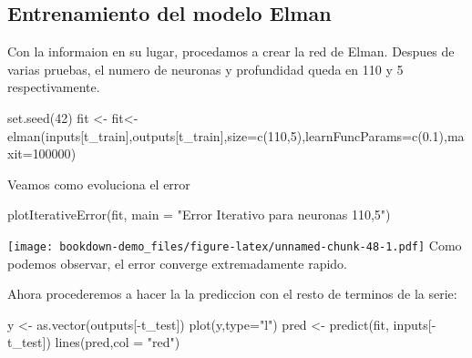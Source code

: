 \documentclass[
]{book}
\newenvironment{Shaded}{\begin{snugshade}}{\end{snugshade}}
\newcommand{\AttributeTok}[1]{\textcolor[rgb]{0.77,0.63,0.00}{#1}}
\newcommand{\DecValTok}[1]{\textcolor[rgb]{0.00,0.00,0.81}{#1}}
\newcommand{\FloatTok}[1]{\textcolor[rgb]{0.00,0.00,0.81}{#1}}
\newcommand{\FunctionTok}[1]{\textcolor[rgb]{0.00,0.00,0.00}{#1}}
\newcommand{\NormalTok}[1]{#1}
\newcommand{\OtherTok}[1]{\textcolor[rgb]{0.56,0.35,0.01}{#1}}
\newcommand{\SpecialCharTok}[1]{\textcolor[rgb]{0.00,0.00,0.00}{#1}}
\newcommand{\StringTok}[1]{\textcolor[rgb]{0.31,0.60,0.02}{#1}}
\begin{document}
\hypertarget{entrenamiento-del-modelo-elman}{%
\subsection{Entrenamiento del modelo Elman}\label{entrenamiento-del-modelo-elman}}

Con la informaion en su lugar, procedamos a crear la red de Elman. Despues de varias pruebas, el numero de neuronas y profundidad queda en 110 y 5 respectivamente.

\begin{Shaded}
\begin{Highlighting}[]
\FunctionTok{set.seed}\NormalTok{(}\DecValTok{42}\NormalTok{)}
\NormalTok{fit }\OtherTok{\textless{}{-}}\NormalTok{ fit}\OtherTok{\textless{}{-}}\FunctionTok{elman}\NormalTok{(inputs[t\_train],outputs[t\_train],}\AttributeTok{size=}\FunctionTok{c}\NormalTok{(}\DecValTok{110}\NormalTok{,}\DecValTok{5}\NormalTok{),}\AttributeTok{learnFuncParams=}\FunctionTok{c}\NormalTok{(}\FloatTok{0.1}\NormalTok{),}\AttributeTok{maxit=}\DecValTok{100000}\NormalTok{)}
\end{Highlighting}
\end{Shaded}

Veamos como evoluciona el error

\begin{Shaded}
\begin{Highlighting}[]
\FunctionTok{plotIterativeError}\NormalTok{(fit, }\AttributeTok{main =} \StringTok{"Error Iterativo para neuronas 110,5"}\NormalTok{)}
\end{Highlighting}
\end{Shaded}

\texttt{[image: bookdown-demo\_files/figure-latex/unnamed-chunk-48-1.pdf]}
Como podemos observar, el error converge extremadamente rapido.

Ahora procederemos a hacer la la prediccion con el resto de terminos de la serie:

\begin{Shaded}
\begin{Highlighting}[]
\NormalTok{y }\OtherTok{\textless{}{-}} \FunctionTok{as.vector}\NormalTok{(outputs[}\SpecialCharTok{{-}}\NormalTok{t\_test])}
\FunctionTok{plot}\NormalTok{(y,}\AttributeTok{type=}\StringTok{"l"}\NormalTok{)}
\NormalTok{pred }\OtherTok{\textless{}{-}} \FunctionTok{predict}\NormalTok{(fit, inputs[}\SpecialCharTok{{-}}\NormalTok{t\_test])}
\FunctionTok{lines}\NormalTok{(pred,}\AttributeTok{col =} \StringTok{"red"}\NormalTok{)}
\end{Highlighting}
\end{Shaded}
\end{document}
